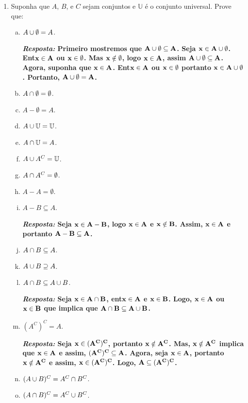 \begin{enumerate}[{\bf 1.}]
\item \label{conjuntos5}Suponha que $A$, $B$, e $C$ sejam conjuntos e $\mathbb{U}$ \'e o conjunto universal. Prove que:
\begin{enumerate}[a)]
\item $A\cup\emptyset=A$.

{\bf{\it Resposta:} Primeiro mostremos que ${\bf A\cup\emptyset\subseteq A}$. Seja ${\bf x\in A\cup\emptyset}$. Ent\ao ${\bf x\in A}$ ou ${\bf x\in\emptyset}$. Mas ${\bf x\notin\emptyset}$, logo ${\bf x\in A}$, assim ${\bf A\cup\emptyset\subseteq A}$. Agora, suponha que ${\bf x\in A}$. Ent\ao ${\bf x\in A}$ ou ${\bf x\in\emptyset}$ portanto ${\bf x\in A\cup\emptyset}$. Portanto, ${\bf A\cup\emptyset =A}$.}
\item $A\cap\emptyset=\emptyset$.
\item $A-\emptyset=A$.
\item $A\cup\mathbb{U}=\mathbb{U}$.
\item $A\cap\mathbb{U}=A$.
\item $A\cup A^C=\mathbb{U}$.
\item $A\cap A^C=\emptyset$.
\item $A-A=\emptyset$.
\item $A-B\subseteq A$.

{\bf{\it Resposta:} Seja ${\bf x\in A-B}$, logo ${\bf x\in A}$ e ${\bf x\notin B}$. Assim, ${\bf x\in A}$ e portanto ${\bf A-B\subseteq A}$.}

\item $A\cap B \subseteq A$.
\item $A\cup B \supseteq A$.
\item $A\cap B\subseteq A\cup B$.

{\bf{\it Resposta:} Seja ${\bf x\in A\cap B}$, ent\ao ${\bf x\in A}$ e ${\bf x\in B}$. Logo, ${\bf x\in A}$ ou ${\bf x\in B}$ que implica que ${\bf A\cap B\subseteq A\cup B}$.}

\item $(A^C)^C=A$.

{\bf{\it Resposta:} Seja ${\bf x\in(A^C)^C}$, portanto ${\bf x\notin A^C}$. Mas, ${\bf x\notin A^C}$ implica que ${\bf x\in A}$ e assim, ${\bf (A^C)^C\subseteq A}$. Agora, seja ${\bf x\in A}$, portanto ${\bf x\notin A^C}$ e assim, ${\bf x\in(A^C)^C}$. Logo, ${\bf A\subseteq (A^C)^C}$.}

\item $(A\cup B)^C = A^C\cap B^C$.
\item $(A\cap B)^C = A^C\cup B^C$.


\end{enumerate}
\end{enumerate}

